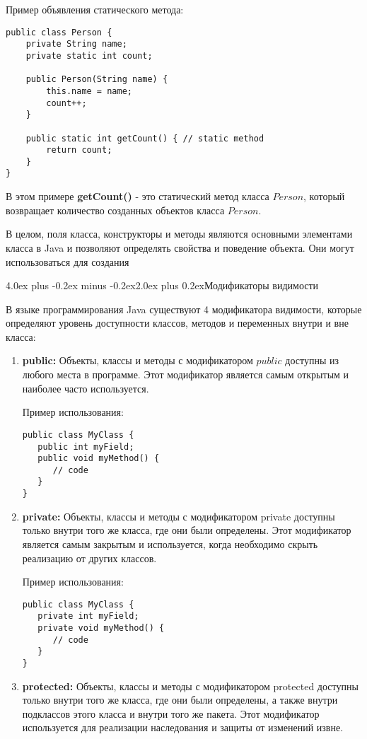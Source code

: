 \documentclass[12pt, a4paper]{book}%
\makeatletter
\renewcommand{\section}{\@startsection{section}{1}{1pt}%
{4.0ex plus -0.2ex minus -0.2ex}{2.0ex plus 0.2ex}{\centering\bf}}%
\makeatother
\begin{document}
{Пример объявления статического метода:

\begin{lstlisting}
public class Person {
    private String name;
    private static int count;

    public Person(String name) {
        this.name = name;
        count++;
    }

    public static int getCount() { // static method
        return count;
    }
}
\end{lstlisting}

В этом примере {\bf getCount()} - это статический метод класса $Person$, который возвращает количество созданных объектов класса $Person$.

В целом, поля класса, конструкторы и методы являются основными элементами класса в Java и позволяют определять свойства и поведение объекта. Они могут использоваться для создания

\section{Модификаторы видимости}

В языке программирования Java существуют 4 модификатора видимости, которые определяют уровень доступности классов, методов и переменных внутри и вне класса:

\begin{enumerate} 
  \item {\bf public:} Объекты, классы и методы с модификатором $public$ доступны из любого места в программе. 
  Этот модификатор является самым открытым и наиболее часто используется. 
  
  Пример использования:

\begin{lstlisting}
public class MyClass {
   public int myField;
   public void myMethod() {
      // code
   }
}
\end{lstlisting}

  \item {\bf private:} Объекты, классы и методы с модификатором private доступны только внутри того же класса, где они были определены. Этот модификатор является самым закрытым и используется, когда необходимо скрыть реализацию от других классов. 
  
Пример использования:

\begin{lstlisting}
public class MyClass {
   private int myField;
   private void myMethod() {
      // code
   }
}
\end{lstlisting}
  \item {\bf protected:} Объекты, классы и методы с модификатором protected доступны только внутри того же класса, где они были определены, а также внутри подклассов этого класса и внутри того же пакета. Этот модификатор используется для реализации наследования и защиты от изменений извне. 
  

\end{enumerate}}
\end{document}
